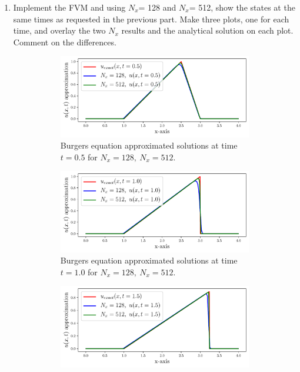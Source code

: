 \pagebreak    
\begin{enumerate}[label=\alph*., start = 2]
    \item Implement the FVM and using $N_x$= 128 and $N_x$= 512, show the states at the same times as requested in the previous part. Make three plots, one for each time, and overlay the two $N_x$ results and the analytical solution on each plot. Comment on the differences.
    
    \vspace{-0.15in}
    \begin{figure}[h!]
        \centering
        \begin{subfigure}[h]{0.7\linewidth}
            \centering
            \includegraphics[width = \linewidth]{q1/t05.pdf}
            \caption{Burgers equation approximated solutions at time $t=0.5$ for $N_x=128,\ N_x =512$.}
            \label{fig:q1_t05}
        \end{subfigure}
        \begin{subfigure}[h]{0.7\linewidth}
            \centering
            \includegraphics[width = \linewidth]{q1/t10.pdf}
            \caption{Burgers equation approximated solutions at time $t=1.0$ for $N_x=128,\ N_x =512$.}
            \label{fig:q1_t10}
        \end{subfigure}
        \begin{subfigure}[h]{0.7\linewidth}
            \centering
            \includegraphics[width = \linewidth]{q1/t15.pdf}

\end{subfigure}
\end{figure}
\end{enumerate}
